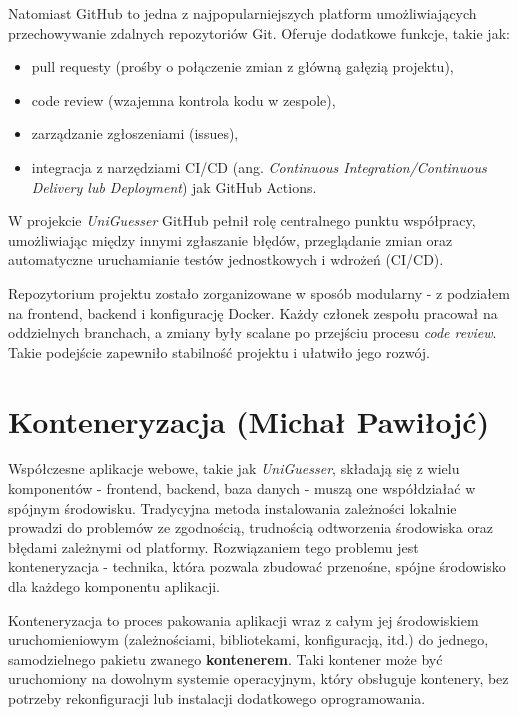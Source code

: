 Natomiast GitHub to jedna z najpopularniejszych platform umożliwiających przechowywanie zdalnych repozytoriów Git. Oferuje dodatkowe funkcje, takie jak:

\begin{itemize}
    \item pull requesty (prośby o połączenie zmian z główną gałęzią projektu),
    \item code review (wzajemna kontrola kodu w zespole),
    \item zarządzanie zgłoszeniami (issues),
    \item integracja z narzędziami CI/CD (ang. \textit{Continuous Integration/Continuous Delivery lub Deployment}) jak GitHub Actions.
\end{itemize}

W projekcie \textit{UniGuesser} GitHub pełnił rolę centralnego punktu współpracy, umożliwiając między innymi zgłaszanie błędów, przeglądanie zmian oraz automatyczne uruchamianie testów jednostkowych i wdrożeń (CI/CD).

Repozytorium projektu zostało zorganizowane w sposób modularny - z podziałem na frontend, backend i konfigurację Docker. Każdy członek zespołu pracował na oddzielnych branchach, a zmiany były scalane po przejściu procesu \textit{code review}. Takie podejście zapewniło stabilność projektu i ułatwiło jego rozwój.

\section{Konteneryzacja (Michał Pawiłojć)}

Współczesne aplikacje webowe, takie jak \textit{UniGuesser}, składają się z wielu komponentów - frontend, backend, baza danych - muszą one współdziałać w spójnym środowisku. Tradycyjna metoda instalowania zależności lokalnie prowadzi do problemów ze zgodnością, trudnością odtworzenia środowiska oraz błędami zależnymi od platformy. Rozwiązaniem tego problemu jest konteneryzacja - technika, która pozwala zbudować przenośne, spójne środowisko dla każdego komponentu aplikacji.

Konteneryzacja to proces pakowania aplikacji wraz z całym jej środowiskiem uruchomieniowym (zależnościami, bibliotekami, konfiguracją, itd.) do jednego, samodzielnego pakietu zwanego \textbf{kontenerem}. Taki kontener może być uruchomiony na dowolnym systemie operacyjnym, który obsługuje kontenery, bez potrzeby rekonfiguracji lub instalacji dodatkowego oprogramowania.

